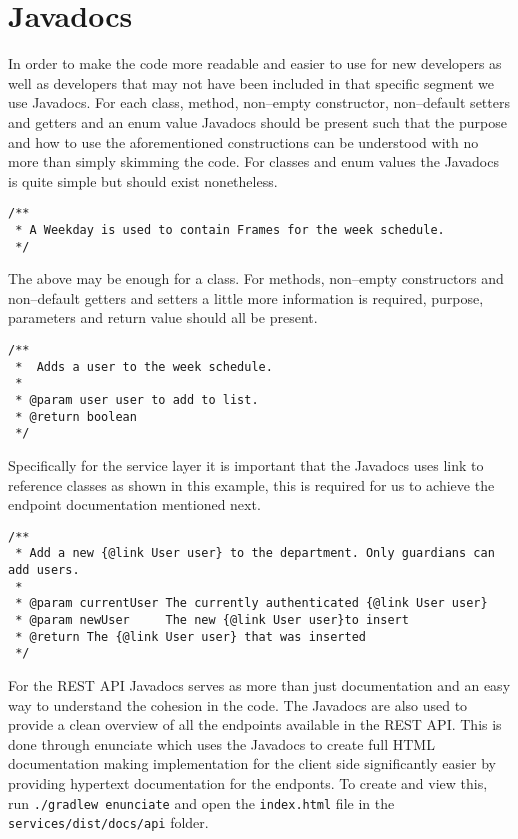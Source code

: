 \newpage
\section{Javadocs}
In order to make the code more readable and easier to use for new developers as well as developers that may not have been included in that specific segment we use Javadocs.
For each class, method, non--empty constructor, non--default setters and getters and an enum value Javadocs should be present such that the purpose and how to use the aforementioned constructions can be understood with no more than simply skimming the code.
For classes and enum values the Javadocs is quite simple but should exist nonetheless.

\begin{lstlisting}
/**
 * A Weekday is used to contain Frames for the week schedule.
 */
\end{lstlisting}

The above may be enough for a class.
For methods, non--empty constructors and non--default getters and setters a little more information is required, purpose, parameters and return value should all be present.

\begin{lstlisting}
/**
 *  Adds a user to the week schedule.
 *
 * @param user user to add to list.
 * @return boolean
 */
\end{lstlisting}

Specifically for the service layer it is important that the Javadocs uses link to reference classes as shown in this example, this is required for us to achieve the endpoint documentation mentioned next.

\begin{lstlisting}
/**
 * Add a new {@link User user} to the department. Only guardians can add users.
 *
 * @param currentUser The currently authenticated {@link User user}
 * @param newUser     The new {@link User user}to insert
 * @return The {@link User user} that was inserted
 */
\end{lstlisting}

For the REST API Javadocs serves as more than just documentation and an easy way to understand the cohesion in the code.
The Javadocs are also used to provide a clean overview of all the endpoints available in the REST API.
This is done through enunciate which uses the Javadocs to create full HTML documentation making implementation for the client side significantly easier by providing hypertext documentation for the endponts.
To create and view this, run \texttt{./gradlew enunciate} and open the \texttt{index.html} file in the \texttt{services/dist/docs/api} folder.
